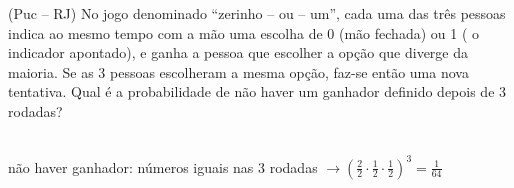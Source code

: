 \begin{ex}
(Puc – RJ) No jogo denominado “zerinho – ou – um”, cada uma das três pessoas indica ao mesmo tempo com a mão uma escolha de 0 (mão fechada) ou 1 ( o indicador apontado), e ganha a pessoa que escolher a opção que diverge da maioria. Se as 3 pessoas escolheram a mesma opção, faz-se então uma nova tentativa. Qual é a probabilidade de não haver um ganhador definido depois de 3 rodadas?
  \begin{sol}
   \phantom{A} \\
   não haver ganhador: números iguais nas 3 rodadas
   $\rightarrow (\frac{2}{2}\cdot\frac{1}{2}\cdot\frac{1}{2})^3=\frac{1}{64}$
  \end{sol}
\end{ex}